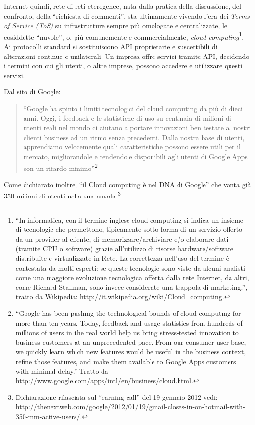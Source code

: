 Internet quindi, rete di reti eterogenee, nata dalla pratica della
discussione, del confronto, della ``richiesta di commenti'', sta
ultimamente vivendo l'era dei \emph{Terms of Service (ToS)} su
infrastrutture sempre più omologate e centralizzate, le cosiddette
``nuvole'', o, più comunemente e commercialmente, \emph{cloud
  computing}\footnote{``In informatica, con il termine inglese cloud
  computing si indica un insieme di tecnologie che permettono,
  tipicamente sotto forma di un servizio offerto da un provider al
  cliente, di memorizzare/archiviare e/o elaborare dati (tramite CPU o
  software) grazie all'utilizzo di risorse hardware/software
  distribuite e virtualizzate in Rete.  La correttezza nell'uso del
  termine è contestata da molti esperti: se queste tecnologie sono
  viste da alcuni analisti come una maggiore evoluzione tecnologica
  offerta dalla rete Internet, da altri, come Richard Stallman, sono
  invece considerate una trappola di marketing.'', tratto da
  Wikipedia: \url{http://it.wikipedia.org/wiki/Cloud_computing}.}. Ai
protocolli standard si sostituiscono API proprietarie e suscettibili
di alterazioni continue e unilaterali. Un impresa offre servizi
tramite API, decidendo i termini con cui gli utenti, o altre imprese,
possono accedere e utilizzare questi servizi.

Dal sito di Google:
\begin{quote}
  ``Google ha spinto i limiti tecnologici del cloud computing da più
  di dieci anni. Oggi, i feedback e le statistiche di uso su centinaia
  di milioni di utenti reali nel mondo ci aiutano a portare
  innovazioni ben testate ai nostri clienti business ad un ritmo senza
  precedenti. Dalla nostra base di utenti, apprendiamo velocemente
  quali caratteristiche possono essere utili per il mercato,
  migliorandole e rendendole disponibili agli utenti di Google Apps
  con un ritardo minimo''\footnote{``Google has been pushing the
    technological bounds of cloud computing for more than ten
    years. Today, feedback and usage statistics from hundreds of
    millions of users in the real world help us bring stress-tested
    innovation to business customers at an unprecedented pace. From
    our consumer user base, we quickly learn which new features would
    be useful in the business context, refine those features, and make
    them available to Google Apps customers with minimal delay.''
    Tratto da
    \url{http://www.google.com/apps/intl/en/business/cloud.html}.}
\end{quote}

Come dichiarato inoltre, ``il Cloud computing è nel DNA di Google''
che vanta già 350 milioni di utenti nella sua nuvola.\footnote{Dichiarazione
  rilasciata sul ``earning call'' del 19 gennaio 2012 vedi:
  \url{http://thenextweb.com/google/2012/01/19/gmail-closes-in-on-hotmail-with-350-mm-active-users/}.}.

